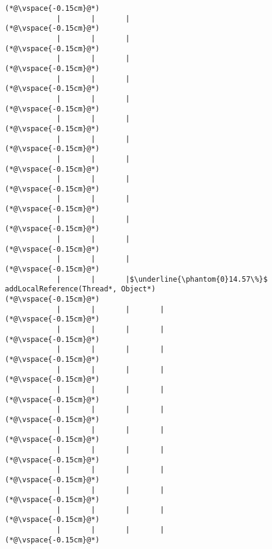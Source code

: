 \begin{lstlisting}[caption=Staattinen metodi Java$\to$C , label=profile:J2CBenchmark00001, numberbychapter=true, frame=lines, float, floatplacement=t]
(*@\vspace{-0.15cm}@*)
            |       |       |
(*@\vspace{-0.15cm}@*)
            |       |       |
(*@\vspace{-0.15cm}@*)
            |       |       |
(*@\vspace{-0.15cm}@*)
            |       |       |
(*@\vspace{-0.15cm}@*)
            |       |       |
(*@\vspace{-0.15cm}@*)
            |       |       |
(*@\vspace{-0.15cm}@*)
            |       |       |
(*@\vspace{-0.15cm}@*)
            |       |       |
(*@\vspace{-0.15cm}@*)
            |       |       |
(*@\vspace{-0.15cm}@*)
            |       |       |
(*@\vspace{-0.15cm}@*)
            |       |       |
(*@\vspace{-0.15cm}@*)
            |       |       |
(*@\vspace{-0.15cm}@*)
            |       |       |
(*@\vspace{-0.15cm}@*)
            |       |       |$\underline{\phantom{0}14.57\%}$ addLocalReference(Thread*, Object*)
(*@\vspace{-0.15cm}@*)
            |       |       |       |
(*@\vspace{-0.15cm}@*)
            |       |       |       |
(*@\vspace{-0.15cm}@*)
            |       |       |       |
(*@\vspace{-0.15cm}@*)
            |       |       |       |
(*@\vspace{-0.15cm}@*)
            |       |       |       |
(*@\vspace{-0.15cm}@*)
            |       |       |       |
(*@\vspace{-0.15cm}@*)
            |       |       |       |
(*@\vspace{-0.15cm}@*)
            |       |       |       |
(*@\vspace{-0.15cm}@*)
            |       |       |       |
(*@\vspace{-0.15cm}@*)
            |       |       |       |
(*@\vspace{-0.15cm}@*)
            |       |       |       |
(*@\vspace{-0.15cm}@*)
            |       |       |       |
(*@\vspace{-0.15cm}@*)

\end{lstlisting}
